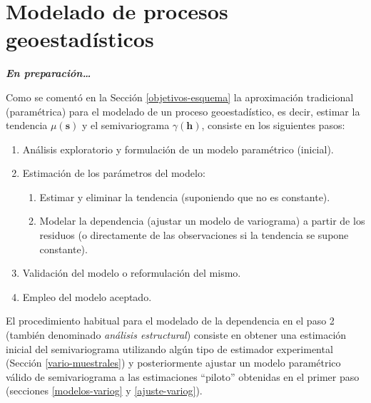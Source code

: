 \documentclass[
  spanish,
]{book}
\theoremstyle{break}
\begin{document}
\hypertarget{modelado}{%
\chapter{Modelado de procesos geoestadísticos}\label{modelado}}

\textbf{\emph{En preparación\ldots{}}}

Como se comentó en la Sección \ref{objetivos-esquema} la aproximación tradicional (paramétrica) para el modelado de un proceso geoestadístico, es decir, estimar la tendencia \(\mu(\mathbf{s})\) y el semivariograma \(\gamma(\mathbf{h})\), consiste en los siguientes pasos:

\begin{enumerate}
\def\labelenumi{\arabic{enumi}.}
\item
  Análisis exploratorio y formulación de un modelo paramétrico (inicial).
\item
  Estimación de los parámetros del modelo:

  \begin{enumerate}
  \def\labelenumii{\arabic{enumii}.}
  \item
    Estimar y eliminar la tendencia (suponiendo que no es constante).
  \item
    Modelar la dependencia (ajustar un modelo de variograma) a partir de los residuos
    (o directamente de las observaciones si la tendencia se supone constante).
  \end{enumerate}
\item
  Validación del modelo o reformulación del mismo.
\item
  Empleo del modelo aceptado.
\end{enumerate}

El procedimiento habitual para el modelado de la dependencia en el paso 2 (también denominado \emph{análisis estructural}) consiste en obtener una estimación inicial del semivariograma utilizando algún tipo de estimador experimental (Sección \ref{vario-muestrales}) y posteriormente ajustar un modelo paramétrico válido de semivariograma a las estimaciones ``piloto'' obtenidas en el primer paso (secciones \ref{modelos-variog} y \ref{ajuste-variog}).
\end{document}
